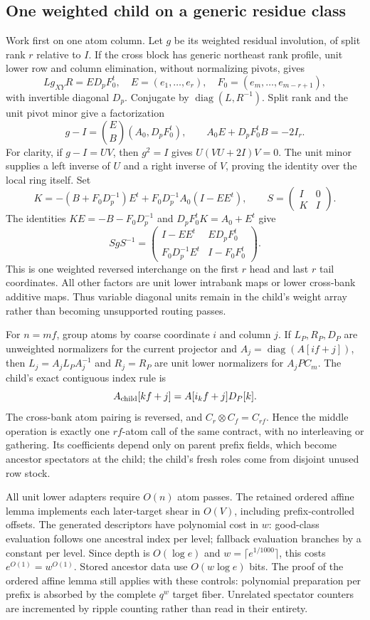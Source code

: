 \subsection{One weighted child on a generic residue class}
Work first on one atom column. Let $g$ be its weighted residual involution,
of split rank $r$ relative to $I$. If the cross block has generic northeast
rank profile, unit lower row and column elimination, without normalizing
pivots, gives
\[
 Lg_{XY}R=ED_pF_0^t,
 \quad E=(e_1,\ldots,e_r),\quad
 F_0=(e_m,\ldots,e_{m-r+1}),
\]
with invertible diagonal $D_p$. Conjugate by $\operatorname{diag}(L,R^{-1})$.
Split rank and the unit pivot minor give a factorization
\[
 g-I=\binom EB(A_0,D_pF_0^t),\qquad
 A_0E+D_pF_0^tB=-2I_r.
\]
For clarity, if $g-I=UV$, then $g^2=I$ gives
$U(VU+2I)V=0$. The unit minor supplies a left inverse of $U$ and a right
inverse of $V$, proving the identity over the local ring itself.
Set
\[
 K=-(B+F_0D_p^{-1})E^t+F_0D_p^{-1}A_0(I-EE^t),
 \qquad S=\begin{pmatrix}I&0\\K&I\end{pmatrix}.
\]
The identities $KE=-B-F_0D_p^{-1}$ and
$D_pF_0^tK=A_0+E^t$ give
\[
 SgS^{-1}=\begin{pmatrix}
 I-EE^t&ED_pF_0^t\\F_0D_p^{-1}E^t&I-F_0F_0^t
 \end{pmatrix}.
\]
This is one weighted reversed interchange on the first $r$ head and last
$r$ tail coordinates. All other factors are unit lower intrabank maps or
lower cross-bank additive maps. Thus variable diagonal units remain in
the child's weight array rather than becoming unsupported routing passes.

For $n=mf$, group atoms by coarse coordinate $i$ and column $j$.
If $L_P,R_P,D_P$ are unweighted normalizers for the current projector and
$A_j=\operatorname{diag}(A[if+j])$, then
$L_j=A_jL_PA_j^{-1}$ and $R_j=R_P$ are unit lower normalizers for
$A_jPC_m$. The child's exact contiguous index rule is
\[
 A_{\rm child}[kf+j]=A[i_kf+j]D_P[k].
\]
The cross-bank atom pairing is reversed, and $C_r\otimes C_f=C_{rf}$.
Hence the middle operation is exactly one $rf$-atom call of the same
contract, with no interleaving or gathering. Its coefficients depend only
on parent prefix fields, which become ancestor spectators at the child;
the child's fresh roles come from disjoint unused row stock.

All unit lower adapters require $O(n)$ atom passes. The retained ordered
affine lemma implements each later-target shear in $O(V)$, including
prefix-controlled offsets. The generated descriptors have polynomial cost
in $w$: good-class evaluation follows one ancestral index per level;
fallback evaluation branches by a constant per level. Since depth is
$O(\log e)$ and $w=\lceil e^{1/1000}\rceil$, this costs $e^{O(1)}=w^{O(1)}$.
Stored ancestor data use $O(w\log e)$ bits. The proof of the ordered affine
lemma still applies with these controls: polynomial preparation per prefix
is absorbed by the complete $q^w$ target fiber. Unrelated spectator counters
are incremented by ripple counting rather than read in their entirety.

